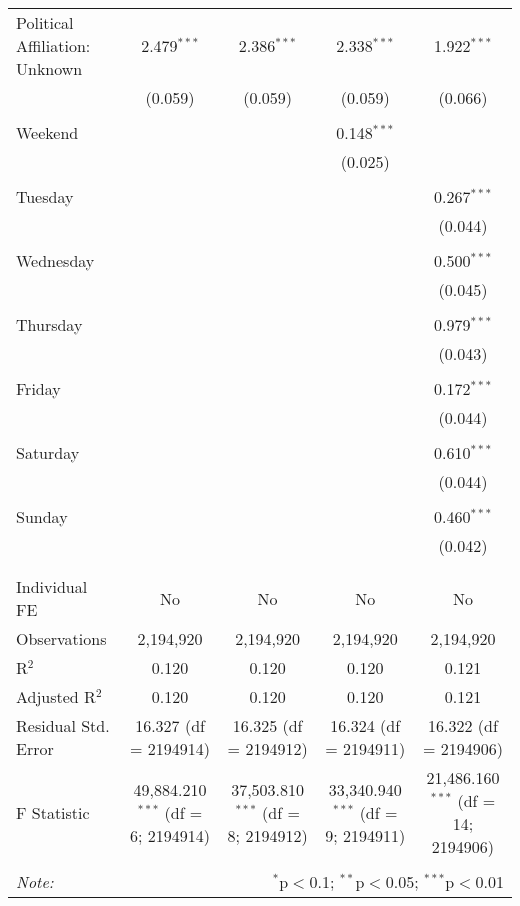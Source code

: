 \documentclass[
]{article}
\begin{document}
\begin{table}[!htbp]
{\begin{tabular}{@{\extracolsep{5pt}}lcccc}
 Political Affiliation: Unknown & 2.479$^{***}$ & 2.386$^{***}$ & 2.338$^{***}$ & 1.922$^{***}$ \\ 
  & (0.059) & (0.059) & (0.059) & (0.066) \\ 
  & & & & \\ 
 Weekend &  &  & 0.148$^{***}$ &  \\ 
  &  &  & (0.025) &  \\ 
  & & & & \\ 
 Tuesday &  &  &  & 0.267$^{***}$ \\ 
  &  &  &  & (0.044) \\ 
  & & & & \\ 
 Wednesday &  &  &  & 0.500$^{***}$ \\ 
  &  &  &  & (0.045) \\ 
  & & & & \\ 
 Thursday &  &  &  & 0.979$^{***}$ \\ 
  &  &  &  & (0.043) \\ 
  & & & & \\ 
 Friday &  &  &  & 0.172$^{***}$ \\ 
  &  &  &  & (0.044) \\ 
  & & & & \\ 
 Saturday &  &  &  & 0.610$^{***}$ \\ 
  &  &  &  & (0.044) \\ 
  & & & & \\ 
 Sunday &  &  &  & 0.460$^{***}$ \\ 
  &  &  &  & (0.042) \\ 
  & & & & \\ 
\hline \\[-1.8ex] 
Individual FE & No & No & No & No \\ 
Observations & 2,194,920 & 2,194,920 & 2,194,920 & 2,194,920 \\ 
R$^{2}$ & 0.120 & 0.120 & 0.120 & 0.121 \\ 
Adjusted R$^{2}$ & 0.120 & 0.120 & 0.120 & 0.121 \\ 
Residual Std. Error & 16.327 (df = 2194914) & 16.325 (df = 2194912) & 16.324 (df = 2194911) & 16.322 (df = 2194906) \\ 
F Statistic & 49,884.210$^{***}$ (df = 6; 2194914) & 37,503.810$^{***}$ (df = 8; 2194912) & 33,340.940$^{***}$ (df = 9; 2194911) & 21,486.160$^{***}$ (df = 14; 2194906) \\ 
\hline 
\hline \\[-1.8ex] 
\textit{Note:}  & \multicolumn{4}{r}{$^{*}$p$<$0.1; $^{**}$p$<$0.05; $^{***}$p$<$0.01} \\ 
\end{tabular}
} 
\end{table} 
\newpage
\end{document}
